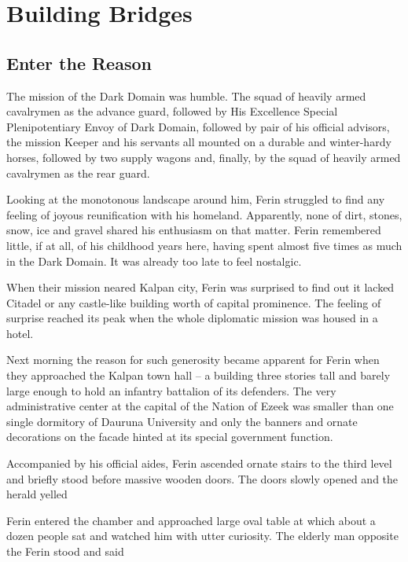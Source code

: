 \chapter{Building Bridges}

\section{Enter the Reason}

The mission of the Dark Domain was humble. The squad of heavily armed cavalrymen as the advance guard, followed by His Excellence Special Plenipotentiary Envoy of Dark Domain, followed by pair of his official advisors, the mission Keeper and his servants all mounted on a durable and winter-hardy horses, followed by two supply wagons and, finally, by the squad of heavily armed cavalrymen as the rear guard.

Looking at the monotonous landscape around him, Ferin struggled to find any feeling of joyous reunification with his homeland. Apparently, none of dirt, stones, snow, ice and gravel shared his enthusiasm on that matter. Ferin remembered little, if at all, of his childhood years here, having spent almost five times as much in the Dark Domain. It was already too late to feel nostalgic.

When their mission neared Kalpan city, Ferin was surprised to find out it lacked Citadel or any castle-like building worth of capital prominence. The feeling of surprise reached its peak when the whole diplomatic mission was housed in a hotel.

Next morning the reason for such generosity became apparent for Ferin when they approached the Kalpan town hall -- a building three stories tall and barely large enough to hold an infantry battalion of its defenders. The very administrative center at the capital of the Nation of Ezeek was smaller than one single dormitory of Dauruna University and only the banners and ornate decorations on the facade hinted at its special government function.

Accompanied by his official aides, Ferin ascended ornate stairs to the third level and briefly stood before massive wooden doors. The doors slowly opened and the herald yelled 

Ferin entered the chamber and approached large oval table at which about a dozen people sat and watched him with utter curiosity. The elderly man opposite the Ferin stood and said 

